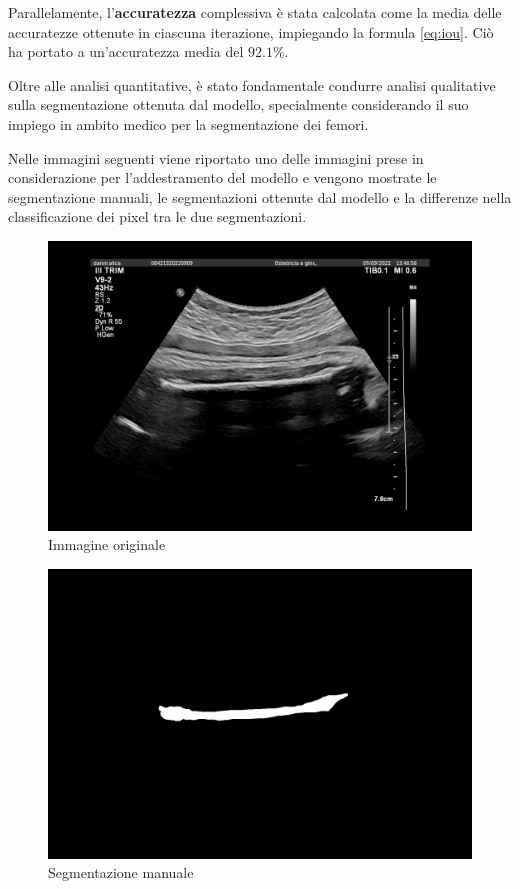 Parallelamente, l'\textbf{accuratezza} complessiva è stata calcolata come la media delle accuratezze
ottenute in ciascuna iterazione, impiegando la formula \ref{eq:iou}. Ciò ha portato a un'accuratezza
media del \textbf{$92.1\%$}.

Oltre alle analisi quantitative, è stato fondamentale condurre analisi qualitative sulla
segmentazione ottenuta dal modello, specialmente considerando il suo impiego in ambito medico per la
segmentazione dei femori.

Nelle immagini seguenti viene riportato uno delle immagini prese in considerazione per
l'addestramento del modello e vengono mostrate le segmentazione manuali, le segmentazioni ottenute
dal modello e la differenze nella classificazione dei pixel tra le due segmentazioni.


\begin{figure}[!ht]
    \centering
    \includegraphics[width=0.6\columnwidth]{Immagini/image.png}
    \caption{Immagine originale}
    \label{fig:immagine originale}
\end{figure}


\begin{figure}[!ht]
    \centering
    \includegraphics[width=0.6\columnwidth]{Immagini/mask.png}
    \caption{Segmentazione manuale}
    \label{fig:segmentazione_manuale}
\end{figure}


